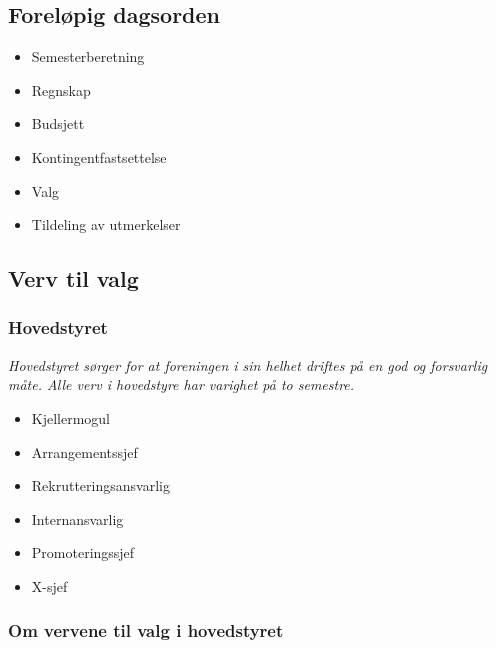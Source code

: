 \documentclass[12pt, norsk, a4paper]{proc}
\providecommand{\tightlist}{%
  \setlength{\itemsep}{0pt}\setlength{\parskip}{0pt}}
\begin{document}
\hypertarget{foreluxf8pig-dagsorden}{%
\subsection*{Foreløpig dagsorden}\label{foreluxf8pig-dagsorden}}

\begin{itemize}
\tightlist
\item
  Semesterberetning
\item
  Regnskap
\item
  Budsjett
\item
  Kontingentfastsettelse
\item
  Valg
\item
  Tildeling av utmerkelser
\end{itemize}

\hypertarget{verv-til-valg}{%
\subsection*{Verv til valg}\label{verv-til-valg}}

\hypertarget{hovedstyret}{%
\subsubsection*{Hovedstyret}\label{hovedstyret}}

\emph{Hovedstyret sørger for at foreningen i sin helhet driftes på en
god og forsvarlig måte. Alle verv i hovedstyre har varighet på to
semestre.}

\begin{itemize}
\tightlist
\item
    Kjellermogul
\item
    Arrangementssjef
\item
    Rekrutteringsansvarlig
\item
    Internansvarlig
\item
    Promoteringssjef
\item
    X-sjef
\end{itemize}

\hypertarget{om-vervene-i-hovedstyret}{%
\subsubsection*{Om vervene til valg i hovedstyret}\label{om-vervene-i-hovedstyret}}
\end{document}
